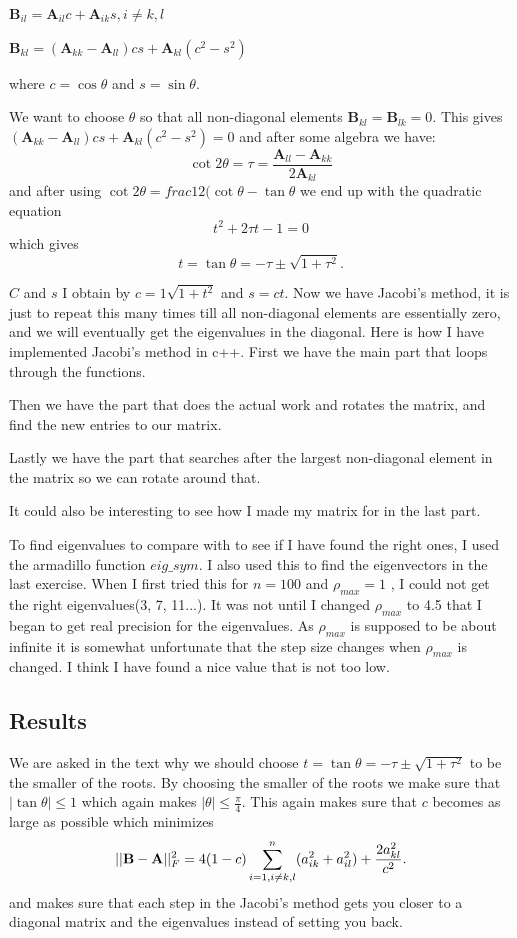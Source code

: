 \documentclass[a4wide,12pt]{article}
\begin{document}
$\textbf{B}_{il} = \textbf{A}_{il}c + \textbf{A}_{ik}s, i \neq k,l$

$\textbf{B}_{kl} = (\textbf{A}_{kk}-\textbf{A}_{ll})cs + \textbf{A}_{kl}(c^2 - s^2)$

where $c = \cos\theta$ and $s = \sin\theta$. 

We want to choose $\theta$ so that all non-diagonal elements $\textbf{B}_{kl} = \textbf{B}_{lk} = 0$.
This gives $(\textbf{A}_{kk}-\textbf{A}_{ll})cs + \textbf{A}_{kl}(c^2 - s^2) = 0$ and after some algebra we have:
\[
\cot{2\theta} = \tau = \frac{\textbf{A}_{ll} - \textbf{A}_{kk}}{2\textbf{A}_{kl}}
\]
and after using $\cot{2\theta} = frac{1}{2}(\cot\theta - \tan\theta$ we end up with the quadratic equation
\[
t^2 + 2\tau t - 1 = 0
\]
which gives 
\[
t = \tan\theta = - \tau \pm \sqrt{1+\tau^2}. 
\]

$C$ and $s$ I obtain by $c = {1}{\sqrt{1+t^2}}$ and $s = ct$. 
Now we have Jacobi's method, it is just to repeat this many times till all non-diagonal elements are essentially zero, and we will eventually get the eigenvalues in the diagonal.
Here is how I have implemented Jacobi's method in c++. 
First we have the main part that loops through the functions.

Then we have the part that does the actual work and rotates the matrix, and find the new entries to our matrix.

Lastly we have the part that searches after the largest non-diagonal element in the matrix so we can rotate around that. 

It could also be interesting to see how I made my matrix for in the last part.


To find eigenvalues to compare with to see if I have found the right ones, I used the armadillo function $\textit{eig\_sym}$. I also used this to find the eigenvectors in the last exercise.
When I first tried this for $n = 100$ and $\rho_{max} = 1$ , I could not get the right eigenvalues(3, 7, 11...). It was not until I changed $\rho_{max}$ to 4.5 that I began to get real precision for the eigenvalues.
As  $\rho_{max}$ is supposed to be about infinite it is somewhat unfortunate that the step size changes when $\rho_{max}$ is changed. I think I have found a nice value that is not too low. 

\subsection*{Results}
We are asked in the text why we should choose $t = \tan\theta = -\tau\pm\sqrt{1+\tau^2}$ to be the smaller of the roots. By choosing the smaller of the roots we make sure that $|\tan\theta| \leq 1$ which again makes $|\theta| \leq \frac{\pi}{4}$. 
This again makes sure that $c$ becomes as large as possible which minimizes 
\[
||{\bf B}-{\bf A}||_F^2=4(1-c)\sum_{i=1,i\ne k,l}^n(a_{ik}^2+a_{il}^2) +\frac{2a_{kl}^2}{c^2}.
\]
and makes sure that each step in the Jacobi's method gets you closer to a diagonal matrix and the eigenvalues instead of setting you back.
\end{document}
